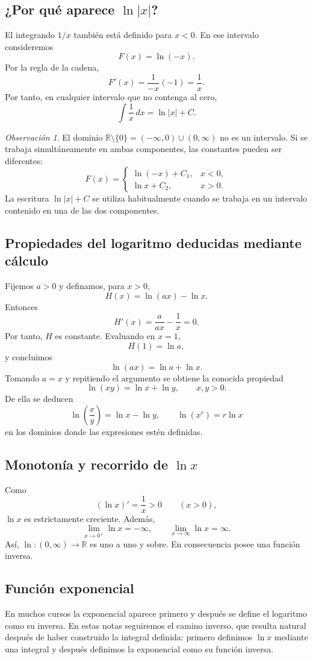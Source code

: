 \documentclass[12pt]{article}
\theoremstyle{definition}
\theoremstyle{remark}
\newtheorem*{observacion}{Observación}
\newcommand{\R}{\mathbb{R}}
\begin{document}
\subsection*{¿Por qué aparece $\ln|x|$?}
El integrando $1/x$ también está definido para $x<0$. En ese intervalo consideremos
\[
F(x)=\ln(-x).
\]
Por la regla de la cadena,
\[
F'(x)=\frac{1}{-x}(-1)=\frac1x.
\]
Por tanto, en cualquier intervalo que no contenga al cero,
\[
\boxed{\int\frac1x\,dx=\ln|x|+C.}
\]
\begin{observacion}
El dominio $\R\setminus\{0\}=(-\infty,0)\cup(0,\infty)$ no es un intervalo. Si se trabaja simultáneamente en ambas componentes, las constantes pueden ser diferentes:
\[
F(x)=\begin{cases}
\ln(-x)+C_1,&x<0,\\[1mm]
\ln x+C_2,&x>0.
\end{cases}
\]
La escritura $\ln|x|+C$ se utiliza habitualmente cuando se trabaja en un intervalo contenido en una de las dos componentes.
\end{observacion}
\subsection*{Propiedades del logaritmo deducidas mediante cálculo}
Fijemos $a>0$ y definamos, para $x>0$,
\[
H(x)=\ln(ax)-\ln x.
\]
Entonces
\[
H'(x)=\frac{a}{ax}-\frac1x=0.
\]
Por tanto, $H$ es constante. Evaluando en $x=1$,
\[
H(1)=\ln a,
\]
y concluimos
\[
\boxed{\ln(ax)=\ln a+\ln x.}
\]
Tomando $a=x$ y repitiendo el argumento se obtiene la conocida propiedad
\[
\boxed{\ln(xy)=\ln x+\ln y,\qquad x,y>0.}
\]
De ella se deducen
\[
\ln\left(\frac{x}{y}\right)=\ln x-\ln y,
\qquad
\ln(x^r)=r\ln x
\]
en los dominios donde las expresiones estén definidas.
\subsection*{Monotonía y recorrido de $\ln x$}
Como
\[
(\ln x)'=\frac1x>0\qquad(x>0),
\]
$\ln x$ es estrictamente creciente. Además,
\[
\lim_{x\to0^+}\ln x=-\infty,
\qquad
\lim_{x\to\infty}\ln x=\infty.
\]
Así, $\ln:(0,\infty)\to\R$ es uno a uno y sobre. En consecuencia posee una función inversa.
\subsection*{Función exponencial}
En muchos cursos la exponencial aparece primero y después se define el logaritmo como su inversa. En estas notas seguiremos el camino inverso, que resulta natural después de haber construido la integral definida: primero definimos $\ln x$ mediante una integral y después definimos la exponencial como su función inversa.
\end{document}
